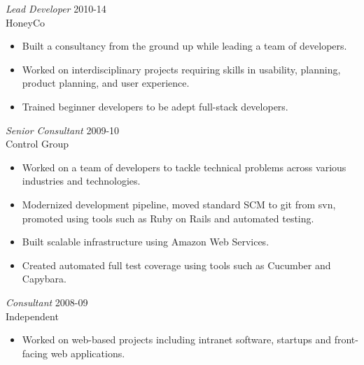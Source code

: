 \documentclass[line,margin]{res}
\begin{document}
\begin{resume}
\begin{itemize}
    \end{itemize}

    {\sl Lead Developer}
    \hfill 2010-14 \\
    HoneyCo
    \begin{itemize} \itemsep -2pt
        \item
            Built a consultancy from the ground up while leading
            a team of developers.

        \item
            Worked on interdisciplinary projects requiring skills in
            usability, planning, product planning, and user experience.

        \item
            Trained beginner developers to be adept full-stack developers.

    \end{itemize}

    {\sl Senior Consultant}
    \hfill 2009-10 \\
    Control Group
    \begin{itemize} \itemsep -2pt
        \item
            Worked on a team of developers to tackle technical problems across
            various industries and technologies.

        \item
            Modernized development pipeline, moved standard SCM to git from
            svn, promoted using tools such as Ruby on Rails and automated
            testing.

        \item
            Built scalable infrastructure using Amazon Web Services.

        \item
            Created automated full test coverage using tools such as Cucumber
            and Capybara.

    \end{itemize}

    \begin{samepage}
    {\sl Consultant}
    \hfill 2008-09 \\
    Independent
    \begin{itemize} \itemsep -2pt
        \item
            Worked on web-based projects including intranet software, startups
            and front-facing web applications.

    \end{itemize}
    \end{samepage}


\end{resume}
\end{document}
